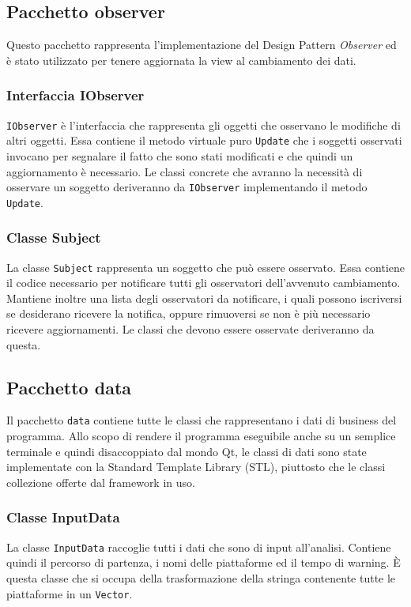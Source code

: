 \subsection{Pacchetto observer}
Questo pacchetto rappresenta l'implementazione del Design Pattern \textit{Observer} ed è stato utilizzato per tenere aggiornata la view al cambiamento dei dati.

\subsubsection{Interfaccia IObserver}
\texttt{IObserver} è l'interfaccia che rappresenta gli oggetti che osservano le modifiche di altri oggetti. Essa contiene il metodo virtuale puro \texttt{Update} che i soggetti osservati invocano per segnalare il fatto che sono stati modificati e che quindi un aggiornamento è necessario. Le classi concrete che avranno la necessità di osservare un soggetto deriveranno da \texttt{IObserver} implementando il metodo \texttt{Update}.

\subsubsection{Classe Subject}
La classe \texttt{Subject} rappresenta un soggetto che può essere osservato. Essa contiene il codice necessario per notificare tutti gli osservatori dell'avvenuto cambiamento. Mantiene inoltre una lista degli osservatori da notificare, i quali possono iscriversi se desiderano ricevere la notifica, oppure rimuoversi se non è più necessario ricevere aggiornamenti. Le classi che devono essere osservate deriveranno da questa.

\subsection{Pacchetto data}
Il pacchetto \texttt{data} contiene tutte le classi che rappresentano i dati di business del programma. Allo scopo di rendere il programma eseguibile anche su un semplice terminale e quindi disaccoppiato dal mondo Qt, le classi di dati sono state implementate con la Standard Template Library (STL), piuttosto che le classi collezione offerte dal framework in uso.

\subsubsection{Classe InputData}
La classe \texttt{InputData} raccoglie tutti i dati che sono di input all'analisi. Contiene quindi il percorso di partenza, i nomi delle piattaforme ed il tempo di warning. È questa classe che si occupa della trasformazione della stringa contenente tutte le piattaforme in un \texttt{Vector}.

